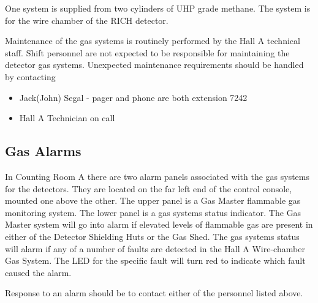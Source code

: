 One system is supplied from two cylinders of UHP grade methane.
The system is for the wire chamber of the RICH detector.

Maintenance of the gas systems is routinely performed by the Hall A
technical staff.  Shift personnel are not expected to be responsible
for maintaining the detector gas systems.  Unexpected maintenance
requirements should be handled by contacting

\begin{itemize} 
\item[~]Jack(John) Segal - pager and phone are both extension 7242
\item[~]Hall A Technician on call
\end{itemize} 

\subsection{Gas Alarms}

In Counting Room A there are two alarm panels associated with the gas
systems for the detectors.  They are located on the far left end of the
control console, mounted one above the other.  The upper panel is a
Gas Master flammable gas monitoring system.  The lower panel is a gas
systems status indicator.  The Gas Master system will go into alarm if
elevated levels of flammable gas are present in either of the Detector
Shielding Huts or the Gas Shed.
The gas systems status will
alarm if any of a number of faults are detected in the Hall A Wire-chamber
Gas System.  The LED for the specific fault will turn red to indicate which
fault caused the alarm.

Response to an alarm should be to contact either of the personnel listed above.
%
%
%
%
